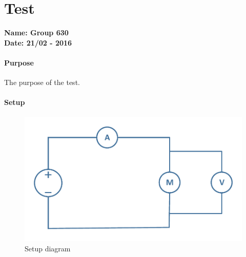 \chapter{Test} \label{test} %
\textbf{Name: Group 630}\\  %
\textbf{Date: 21/02 - 2016}

\subsubsection{Purpose}
The purpose of the test.

\subsubsection{Setup}
\begin{figure}[H]
	\includegraphics[scale=.45]{figures/MotorTest1.pdf}  %
	\caption{Setup diagram}                              %
\end{figure}                                           %
